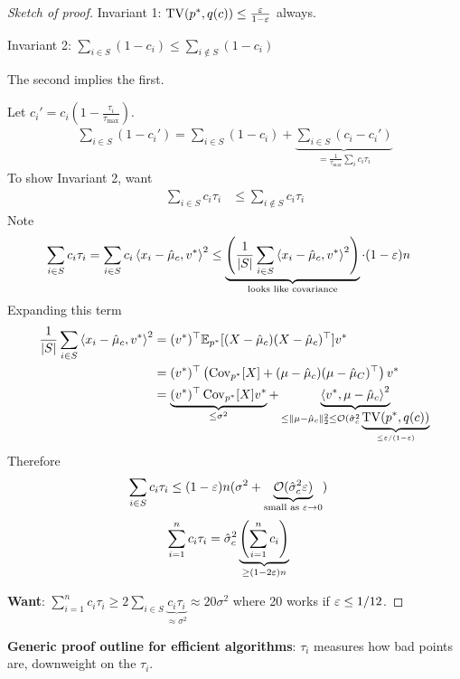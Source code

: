 \begin{proof}[Sketch of proof]
  Invariant 1: $\operatorname{TV}(p^*, q(c)) \leq \frac{\varepsilon}{1-\varepsilon}$ always.

  Invariant 2: $\sum_{i \in S} (1 - c_i) \leq \sum_{i \not\in S}(1 - c_i)$

  The second implies the first.

  Let $c_i' = c_i \left( 1 - \frac{\tau_i}{\tau_{\max}} \right)$.
  \begin{align}
    \sum_{i \in S} (1 - c_i') = \sum_{i \in S} (1 - c_i) +
    \underbrace{\sum_{i \in S} (c_i - c_i')}_{=\frac{1}{\tau_{\max}} \sum_i c_i \tau_i}
  \end{align}
  To show Invariant 2, want
  \begin{align}
    \sum_{i \in S} c_i \tau_i &\leq \sum_{i \not\in S} c_i \tau_i
  \end{align}
  Note
  \begin{align}
    \sum_{i \in S} c_i \tau_i
    &= \sum_{i \in S} c_i \braket{x_i - \hat\mu_c, v^*}^2
    \leq \underbrace{\left(\frac{1}{\lvert S \rvert} \sum_{i \in S} \braket{x_i - \hat\mu_c, v^*}^2\right)}_{\text{looks like covariance}}
  \cdot (1 - \varepsilon)n
  \end{align}
  Expanding this term
  \begin{align}
    \frac{1}{\lvert S \rvert} \sum_{i \in S} \braket{x_i - \hat\mu_c, v^*}^2
    &= (v^*)^\top \mathbb{E}_{p^*}[(X - \hat\mu_c) (X - \hat\mu_c)^\top] v^* \\
    &= (v^*)^\top \left(
      \operatorname{Cov}_{p^*}[X] + (\mu - \hat\mu_c)(\mu - \hat\mu_C)^\top
    \right) v^* \\
    &= \underbrace{(v^*)^\top \operatorname{Cov}_{p^*}[X] v^*}_{\leq \sigma^2}
    + \underbrace{\braket{v^*, \mu - \hat\mu_c}^2}_{\leq \|\mu - \hat\mu_c\|_2^2
    \leq \mathcal{O}(\hat\sigma_c^2 \underbrace{\operatorname{TV}(p^*, q(c))}_{\leq \varepsilon/(1-\varepsilon)}}
  \end{align}
  Therefore
  \begin{align}
    \sum_{i \in S} c_i \tau_i &\leq (1 - \varepsilon) n (\sigma^2 +
    \underbrace{\mathcal{O}(\hat\sigma_c^2 \varepsilon)}_{\text{small as }\varepsilon \to 0})
  \end{align}
  \begin{align}
    \sum_{i=1}^n c_i \tau_i
    &= \hat\sigma_c^2 \underbrace{\left(\sum_{i=1}^n c_i\right)}_{\geq (1 - 2 \varepsilon) n}
  \end{align}

  \textbf{Want}: $\sum_{i=1}^n c_i \tau_i \geq 2 \sum_{i \in S} \underbrace{c_i \tau_i}_{\approx \sigma^2} \approx 20 \sigma^2$ where 20 works if $\varepsilon \leq 1/12$.
\end{proof}

\textbf{Generic proof outline for efficient algorithms}: $\tau_i$ measures how bad points are, downweight on the $\tau_i$.
